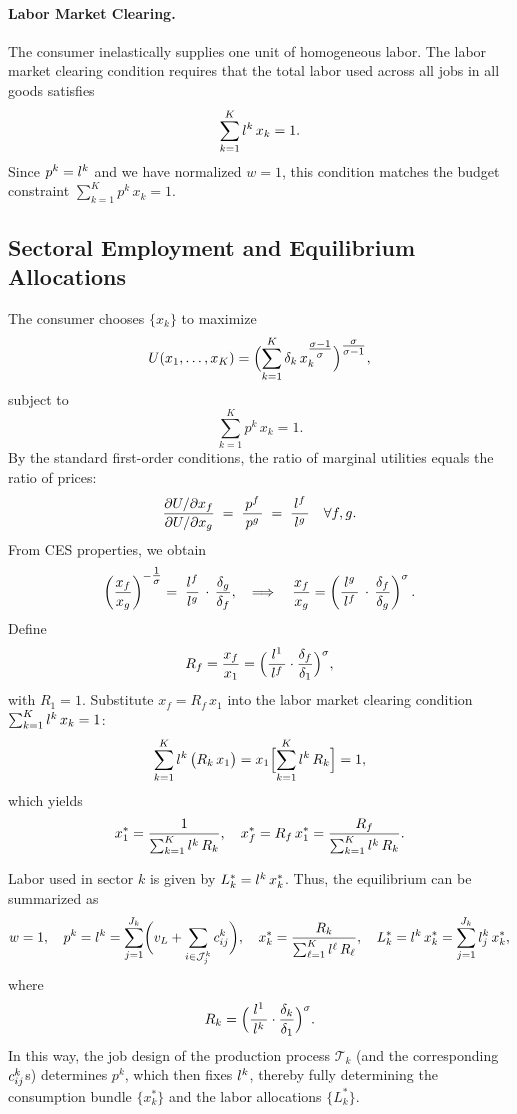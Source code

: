 \documentclass{article}
\theoremstyle{plain}
\theoremstyle{plain}
\begin{document}
\paragraph{Labor Market Clearing.}

The consumer inelastically supplies one unit of homogeneous labor.  
The labor market clearing condition requires that the total labor used across all jobs in all goods satisfies
\[
\sum_{k=1}^K l_{}^k\, x_k = 1.
\]
Since $p^k = l_{}^k$ and we have normalized $w=1$, this condition matches the budget constraint 
\(\sum_{k=1}^K p^k\, x_k = 1\).

\subsection{Sectoral Employment and Equilibrium Allocations}

The consumer chooses $\{x_k\}$ to maximize 
\[
U(x_1,\dots,x_K)
=
\Bigl(\sum_{k=1}^K \delta_k \,x_k^{\tfrac{\sigma-1}{\sigma}}\Bigr)^{\tfrac{\sigma}{\sigma-1}},
\]
subject to
\[
\sum_{k=1}^K p^k\, x_k = 1.
\]
By the standard first-order conditions, the ratio of marginal utilities equals the ratio of prices:
\[
\frac{\partial U/\partial x_f}{\partial U/\partial x_g} \;=\; \frac{\,p^f\,}{\,p^g\,} \;=\; \frac{\,l_{}^f\,}{\,l_{}^g\,} \quad \forall f,g.
\]
From CES properties, we obtain
\[
\left(\frac{x_f}{x_g}\right)^{-\tfrac{1}{\sigma}}
=\;
\frac{l_{}^f}{l_{}^g}\,\cdot\,\frac{\delta_g}{\delta_f},
\quad
\Longrightarrow
\quad
\frac{x_f}{x_g}
=
\left(\frac{\,l_{}^g\,}{\,l_{}^f\,}\,\cdot\,\frac{\delta_f}{\delta_g}\right)^{\sigma}.
\]
Define
\[
R_f = \frac{x_f}{x_1} = \Bigl(\frac{\,l_{}^1\,}{\,l_{}^f\,} \cdot \frac{\delta_f}{\delta_1}\Bigr)^{\sigma},
\]
with $R_1 = 1$.  
Substitute $x_f = R_f\,x_1$ into the labor market clearing condition $\sum_{k=1}^K l_{}^k\, x_k = 1$:
\[
\sum_{k=1}^K l_{}^k\,\bigl(R_k\,x_1\bigr)
=
x_1\Bigl[\sum_{k=1}^K l_{}^k\,R_k\Bigr]
=
1,
\]
which yields
\[
x_1^* = \frac{1}{\sum_{k=1}^K l_{}^k\,R_k},
\quad
x_f^* = R_f\,x_1^* = \frac{\,R_f\,}{\sum_{k=1}^K l_{}^k\,R_k}.
\]

Labor used in sector $k$ is given by $L_k^* = l_{}^k\,x_k^*$.  
Thus, the equilibrium can be summarized as
\[
w = 1,
\quad
p^k = l_{}^k = \sum_{j=1}^{J_k} \biggl( v_L + \sum_{i \in \mathcal{J}_j^k} c_{ij}^{k} \biggr),
\quad
x_k^* = \frac{R_k}{\sum_{\ell=1}^K l_{}^\ell\,R_\ell},
\quad
L_k^* = l_{}^k\,x_k^* = \sum_{j=1}^{J_k} l_{j}^k\, x_k^*,
\]
where
\[
R_k = \Bigl(\frac{\,l_{}^1\,}{\,l_{}^k\,} \cdot \frac{\delta_k}{\delta_1}\Bigr)^{\sigma}.
\]
In this way, the job design of the production process $\mathcal{T}_k$ (and the corresponding $c_{ij}^k$s) determines $p^k$, which then fixes $l_{}^k$, thereby fully determining the consumption bundle $\{x_k^*\}$ and the labor allocations $\{L_k^*\}$.
\end{document}
